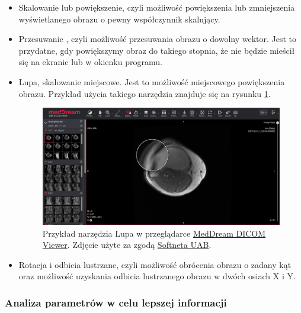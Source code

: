 \begin{itemize}
    \item Skalowanie lub powiększenie, czyli możliwość powiększenia lub zmniejszenia wyświetlanego obrazu o pewny współczynnik skalujący.

    \item Przesuwanie , czyli możliwość przesuwania obrazu o dowolny wektor.
          Jest to przydatne, gdy powiększymy obraz do takiego stopnia, że nie będzie mieścił się na ekranie lub w okienku programu.

    \item Lupa, skalowanie miejscowe.
          Jest to możliwość miejscowego powiększenia obrazu.
          Przykład użycia takiego narzędzia znajduje się na rysunku \ref{fig:wyswietlanie001}.

          \begin{figure}[!htbp]
              \centering
              \includegraphics[width=\textwidth]{img/wyswietlanie001.png}
              \caption{Przykład narzędzia Lupa w przeglądarce \href{https://www.softneta.com/products/meddream-dicom-viewer/}{MedDream DICOM Viewer}. Zdjęcie użyte za zgodą \href{https://www.softneta.com/}{Softneta UAB}.}
              \label{fig:wyswietlanie001}
          \end{figure}

    \item Rotacja i odbicia lustrzane, czyli możliwość obrócenia obrazu o zadany kąt oraz możliwość uzyskania odbicia lustrzanego obrazu w dwóch osiach X i Y.

\end{itemize}

\subsubsection{Analiza parametrów w celu lepszej informacji}

